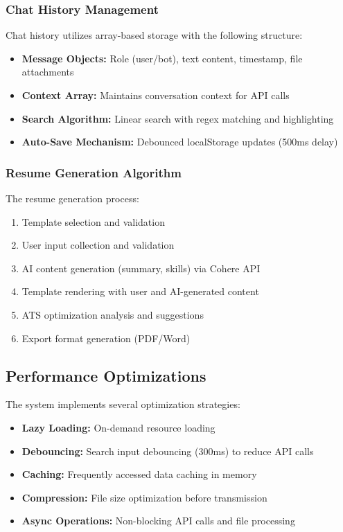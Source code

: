 \documentclass[conference]{IEEEtran}
\begin{document}
\subsubsection{Chat History Management}
Chat history utilizes array-based storage with the following structure:
\begin{itemize}[itemsep=0pt, parsep=0pt, leftmargin=*]
    \item \textbf{Message Objects:} Role (user/bot), text content, timestamp, file attachments
    \item \textbf{Context Array:} Maintains conversation context for API calls
    \item \textbf{Search Algorithm:} Linear search with regex matching and highlighting
    \item \textbf{Auto-Save Mechanism:} Debounced localStorage updates (500ms delay)
\end{itemize}

\subsubsection{Resume Generation Algorithm}
The resume generation process:
\begin{enumerate}[itemsep=0pt, parsep=0pt]
    \item Template selection and validation
    \item User input collection and validation
    \item AI content generation (summary, skills) via Cohere API
    \item Template rendering with user and AI-generated content
    \item ATS optimization analysis and suggestions
    \item Export format generation (PDF/Word)
\end{enumerate}

\subsection{Performance Optimizations}
The system implements several optimization strategies:
\begin{itemize}[itemsep=0pt, parsep=0pt, leftmargin=*]
    \item \textbf{Lazy Loading:} On-demand resource loading
    \item \textbf{Debouncing:} Search input debouncing (300ms) to reduce API calls
    \item \textbf{Caching:} Frequently accessed data caching in memory
    \item \textbf{Compression:} File size optimization before transmission
    \item \textbf{Async Operations:} Non-blocking API calls and file processing
\end{itemize}
\end{document}
